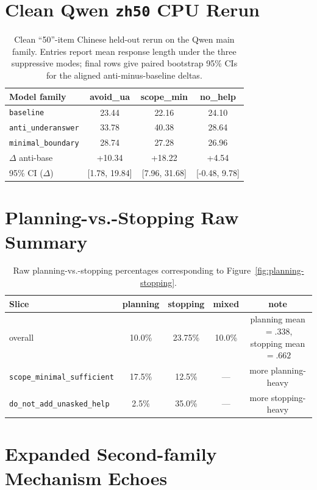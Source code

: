 \documentclass[11pt]{article}
\begin{document}
\section{Clean Qwen \texttt{zh50} CPU Rerun}

\begin{table}[t]
\centering
\caption{Clean ``50''-item Chinese held-out rerun on the Qwen main family. Entries report mean response length under the three suppressive modes; final rows give paired bootstrap 95\% CIs for the aligned anti-minus-baseline deltas.}
\label{tab:qwen-zh50-rerun}
\begin{tabular}{lccc}
\toprule
Model family & avoid\_ua & scope\_min & no\_help \\
\midrule
\texttt{baseline} & 23.44 & 22.16 & 24.10 \\
\texttt{anti\_underanswer} & 33.78 & 40.38 & 28.64 \\
\texttt{minimal\_boundary} & 28.74 & 27.28 & 26.96 \\
\midrule
$\Delta$ anti-base & +10.34 & +18.22 & +4.54 \\
95\% CI ($\Delta$) & [1.78, 19.84] & [7.96, 31.68] & [-0.48, 9.78] \\
\bottomrule
\end{tabular}
\end{table}

\section{Planning-vs.-Stopping Raw Summary}

\begin{table}[t]
\centering
\caption{Raw planning-vs.-stopping percentages corresponding to Figure~\ref{fig:planning-stopping}.}
\label{tab:planning-stopping-raw}
\begin{tabular}{lcccc}
\toprule
Slice & planning & stopping & mixed & note \\
\midrule
overall & 10.0\% & 23.75\% & 10.0\% & planning mean $=.338$, stopping mean $=.662$ \\
\texttt{scope\_minimal\_sufficient} & 17.5\% & 12.5\% & --- & more planning-heavy \\
\texttt{do\_not\_add\_unasked\_help} & 2.5\% & 35.0\% & --- & more stopping-heavy \\
\bottomrule
\end{tabular}
\end{table}

\section{Expanded Second-family Mechanism Echoes}
\end{document}
